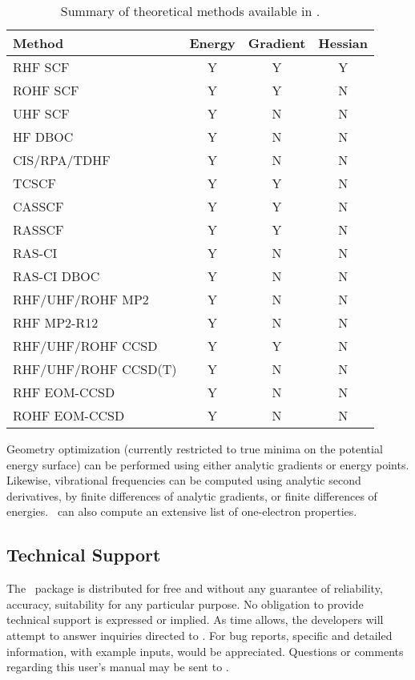 \begin{table}
\caption{Summary of theoretical methods available in \PSIthree.} \label{table:methods}
\parsep 10pt
\begin{center}
\begin{tabular}{lccc} \hline\hline
Method              & Energy & Gradient & Hessian \\ \hline
RHF SCF             & Y & Y & Y \\
ROHF SCF            & Y & Y & N \\
UHF SCF             & Y & N & N \\
HF DBOC             & Y & N & N \\
CIS/RPA/TDHF        & Y & N & N \\
TCSCF               & Y & Y & N \\
CASSCF              & Y & Y & N \\
RASSCF              & Y & Y & N \\
RAS-CI              & Y & N & N \\
RAS-CI DBOC         & Y & N & N \\
RHF/UHF/ROHF MP2    & Y & N & N \\
RHF MP2-R12         & Y & N & N \\
RHF/UHF/ROHF CCSD   & Y & Y & N \\
RHF/UHF/ROHF CCSD(T)& Y & N & N \\
RHF EOM-CCSD        & Y & N & N \\
ROHF EOM-CCSD       & Y & N & N \\
\hline\hline
\end{tabular}
\end{center}
\end{table}
Geometry optimization (currently restricted to true minima on the potential
energy surface) can be performed using either analytic gradients
or energy points.  Likewise, vibrational frequencies can be 
computed using analytic second derivatives, by finite
differences of analytic gradients, or finite differences of energies.
\PSIthree\ can also compute an extensive list of one-electron properties.

\subsection{Technical Support} The \PSIthree\ package is
distributed for free and without any guarantee of reliability,
accuracy, suitability for any particular purpose.  No obligation
to provide technical support is expressed or implied.  As time
allows, the developers will attempt to answer inquiries directed to
.
For bug reports, specific and detailed information, with example
inputs, would be appreciated.  Questions or comments regarding
this user's manual may be sent to .



